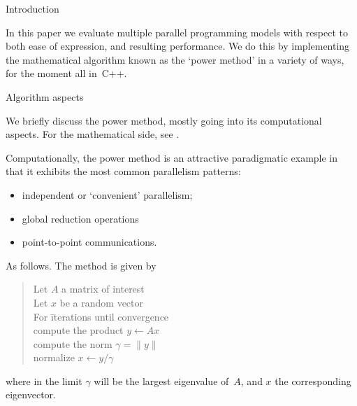 
 {Introduction}

In this paper we evaluate multiple parallel programming models
with respect to both ease of expression, and resulting performance.
We do this by implementing the mathematical algorithm
known as the `power method' in a variety of ways,
for the moment all in~C++.

 {Algorithm aspects}

We briefly discuss the power method, mostly going into
its computational aspects.
For the mathematical side, see .

Computationally, the power method is an attractive paradigmatic example
in that it exhibits the most common parallelism patterns:
\begin{itemize}
\item independent or `convenient' parallelism;
\item global reduction operations
\item point-to-point communications.
\end{itemize}
As follows.
The method is given by
\begin{quote}
  \begin{tabbing}
    Let $A$ a matrix of interest\\
    Let $x$ be a random vector\\
    For \=iterations until convergence\\
    \> compute the product $y\leftarrow Ax$\\
    \> compute the norm $\gamma=\| y \|$\\
    \> normalize $x\leftarrow y/\gamma$\\
  \end{tabbing}
\end{quote}
where in the limit $\gamma$ will be the
largest eigenvalue of~$A$,
and $x$ the corresponding eigenvector.

